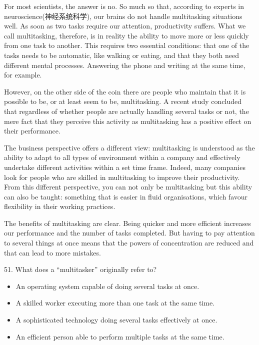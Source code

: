 \documentclass[UTF8,11pt]{ctexart}
\begin{document}
For most scientists, the answer is no. So much so that, according to experts in neuroscience(神经系统科学), our brains do not handle multitasking situations well. As soon as two tasks require our attention, productivity suffers. What we call multitasking, therefore, is in reality the ability to move more or less quickly from one task to another. This requires two essential conditions: that one of the tasks needs to be automatic, like walking or eating, and that they both need different mental processes. Answering the phone and writing at the same time, for example.


However, on the other side of the coin there are people who maintain that it is possible to be, or at least seem to be, multitasking. A recent study concluded that regardless of whether people are actually handling several tasks or not, the mere fact that they perceive this activity as multitasking has a positive effect on their performance.


The business perspective offers a different view: multitasking is understood as the ability to adapt to all types of environment within a company and effectively undertake different activities within a set time frame. Indeed, many companies look for people who are skilled in multitasking to improve their productivity. From this different perspective, you can not only be multitasking but this ability can also be taught: something that is easier in fluid organisations, which favour flexibility in their working practices.


The benefits of multitasking are clear. Being quicker and more efficient increases our performance and the number of tasks completed. But having to pay attention to several things at once means that the powers of concentration are reduced and that can lead to more mistakes.


51. What does a “multitasker” originally refer to?


\begin{itemize}[leftmargin=2em,itemsep=.2em,topsep=.4em]\item[A.] An operating system capable of doing several tasks at once.
\item[B.] A skilled worker executing more than one task at the same time.
\item[C.] A sophisticated technology doing several tasks effectively at once.
\item[D.] An efficient person able to perform multiple tasks at the same time.
\end{itemize}
\end{document}
